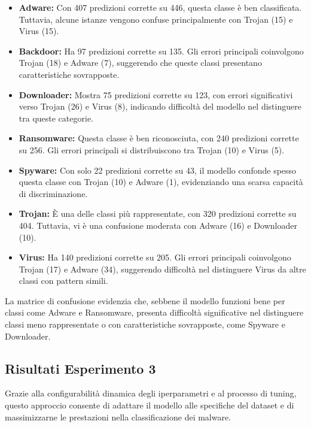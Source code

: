 \begin{itemize}
    \item \textbf{Adware:} Con 407 predizioni corrette su 446, questa classe è ben classificata. Tuttavia, alcune istanze vengono confuse principalmente con Trojan (15) e Virus (15).
    \item \textbf{Backdoor:} Ha 97 predizioni corrette su 135. Gli errori principali coinvolgono Trojan (18) e Adware (7), suggerendo che queste classi presentano caratteristiche sovrapposte.
    \item \textbf{Downloader:} Mostra 75 predizioni corrette su 123, con errori significativi verso Trojan (26) e Virus (8), indicando difficoltà del modello nel distinguere tra queste categorie.
    \item \textbf{Ransomware:} Questa classe è ben riconosciuta, con 240 predizioni corrette su 256. Gli errori principali si distribuiscono tra Trojan (10) e Virus (5).
    \item \textbf{Spyware:} Con solo 22 predizioni corrette su 43, il modello confonde spesso questa classe con Trojan (10) e Adware (1), evidenziando una scarsa capacità di discriminazione.
    \item \textbf{Trojan:} È una delle classi più rappresentate, con 320 predizioni corrette su 404. Tuttavia, vi è una confusione moderata con Adware (16) e Downloader (10).
    \item \textbf{Virus:} Ha 140 predizioni corrette su 205. Gli errori principali coinvolgono Trojan (17) e Adware (34), suggerendo difficoltà nel distinguere Virus da altre classi con pattern simili.
\end{itemize}
La matrice di confusione evidenzia che, sebbene il modello funzioni bene per classi come Adware e Ransomware, presenta difficoltà significative nel distinguere classi meno rappresentate o con caratteristiche sovrapposte, come Spyware e Downloader.


\subsection{Risultati Esperimento 3}
Grazie alla configurabilità dinamica degli iperparametri e al processo di tuning, questo approccio consente di adattare il modello alle specifiche del dataset e di massimizzarne le prestazioni nella classificazione dei malware.
